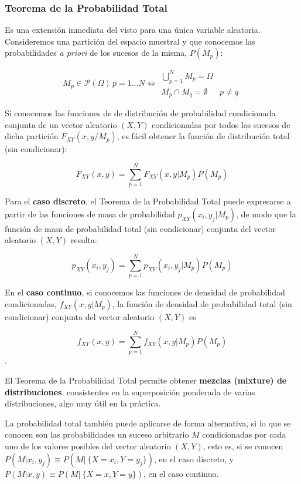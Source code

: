 \documentclass[11pt]{article}
\begin{document}
    \hypertarget{teorema-de-la-probabilidad-total}{%
\subsubsection{Teorema de la Probabilidad
Total}\label{teorema-de-la-probabilidad-total}}

Es una extensión inmediata del visto para una única variable aleatoria.
Consideremos una partición del espacio muestral y que conocemos las
probabilidades \emph{a priori} de los sucesos de la misma, \(P(M_p)\):

\[
M_p \in \mathscr{P}(\Omega) \, p=1\ldots N\iff  \begin{matrix}
  \bigcup_{p=1}^N M_p = \Omega &  \\
  M_p \cap M_q = \emptyset & p\neq q  
 \end{matrix}
\]

Si conocemos las funciones de de distribución de probabilidad
condicionada conjunta de un vector aleatorio \((X,Y)\) condicionadas por
todos los sucesos de dicha partición \(F_{XY}(x,y/M_p)\), es fácil
obtener la función de distribución total (sin condicionar):

\[F_{XY}(x,y) = \sum_{p=1}^N F_{XY}(x,y | M_p)P(M_p)\]

    Para el \textbf{caso discreto}, el Teorema de la Probabilidad Total
puede expresarse a partir de las funciones de masa de probabilidad
\(p_{XY}(x_i,y_j | M_p)\), de modo que la función de masa de
probabilidad total (sin condicionar) conjunta del vector aleatorio
\((X,Y)\) resulta:

\[p_{XY}(x_i,y_j) = \sum_{p=1}^N p_{XY}(x_i,y_j | M_p)P(M_p)\]

En el \textbf{caso continuo}, si conocemos las funciones de densidad de
probabilidad condicionadas, \(f_{XY}(x,y | M_p)\), la función de
densidad de probabilidad total (sin condicionar) conjunta del vector
aleatorio \((X,Y)\) es

\[f_{XY}(x,y) = \sum_{p=1}^N f_{XY}(x,y | M_p)P(M_p)\].

El Teorema de la Probabilidad Total permite obtener \textbf{mezclas
(mixture) de distribuciones}. consistentes en la superposición ponderada
de varias distribuciones, algo muy útil en la práctica.

    La probabilidad total también puede aplicarse de forma alternativa, si
lo que se conocen son las probabilidades un suceso arbitrario \(M\)
condicionadas por cada uno de los valores posibles del vector aleatorio
\((X,Y)\), esto es, si se conocen
\(P(M | x_i,y_j)\equiv P(M | \ \{X=x_i,Y=y_j\})\), en el caso discreto,
y \(P(M | x,y)\equiv P(M | \ \{X=x,Y=y\})\), en el caso continuo.
\end{document}
